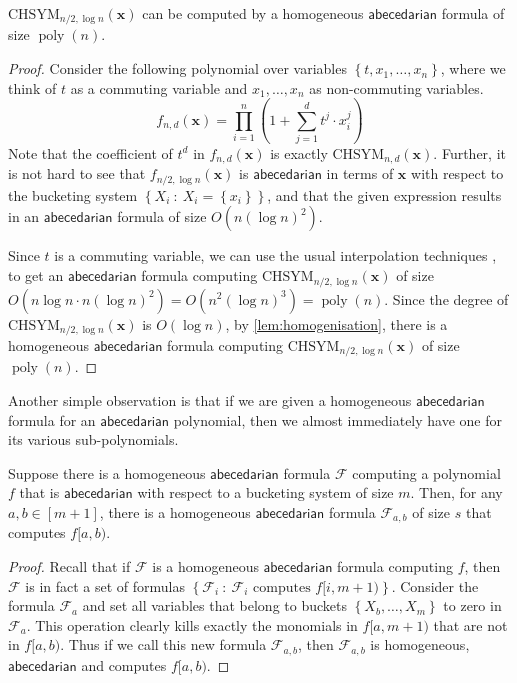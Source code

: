 \documentclass[10pt,a4paper]{article}
\def\poly{\operatorname{poly}}
\def\set#1{\left\{ #1 \right\}}
\def\inparen#1{\left( #1 \right)}
\def\inbrace#1{\left\{ #1 \right\}}
\def\setdef#1#2{\inbrace{ #1 \ : \ #2}}
\def\vecx{\mathbf{x}}
\newcommand{\form}{\textbf{$\mathcal{F}$}}
\newcommand{\abcd}{\mathsf{abecedarian}}
\newcommand{\chsym}[2]{\mathrm{CHSYM}_{#1,#2}}
\begin{document}
\begin{observation}\label{obs:UBonCHSYMlogDeg}
	$\chsym{n/2}{\log n}(\vecx)$ can be computed by a homogeneous $\abcd$ formula of size $\poly(n)$.
\end{observation}

\begin{proof}
	Consider the following polynomial over variables $\set{t, x_1, \ldots, x_n}$, where we think of $t$ as a commuting variable and $x_1, \ldots, x_n$ as non-commuting variables. 
	\[
		f_{n, d}(\vecx) = \prod_{i=1}^{n} \inparen{1 + \sum_{j=1}^{d} t^j \cdot x_i^j}
	\]
	Note that the coefficient of $t^d$ in $f_{n, d}(\vecx)$ is exactly $\chsym{n}{d}(\vecx)$.
	Further, it is not hard to see that $f_{n/2, \log n}(\vecx)$ is $\abcd$ in terms of $\vecx$ with respect to the bucketing system $\setdef{X_i}{X_i = \set{x_i}}$, and that the given expression results in an $\abcd$ formula of size $O(n (\log n)^2)$. 
	
	Since $t$ is a commuting variable, we can use the usual interpolation techniques \cite{BC92}, to get an $\abcd$ formula computing $\chsym{n/2}{\log n}(\vecx)$ of size $O(n \log n \cdot n (\log n)^2) = O(n^2 (\log n)^3) = \poly(n)$. 
	Since the degree of $\chsym{n/2}{\log n}(\vecx)$ is $O(\log n)$, by \autoref{lem:homogenisation}, there is a homogeneous $\abcd$ formula computing $\chsym{n/2}{\log n}(\vecx)$ of size $\poly(n)$.
\end{proof}

\noindent Another simple observation is that if we are given a homogeneous $\abcd$ formula for an $\abcd$ polynomial, then we almost immediately have one for its various sub-polynomials.

\begin{observation}\label{obs:subformula}
	Suppose there is a homogeneous $\abcd$ formula $\form$ computing a polynomial $f$ that is $\abcd$ with respect to a bucketing system of size $m$. 
	Then, for any $a, b \in [m+1]$, there is a homogeneous $\abcd$ formula $\form_{a,b}$ of size $s$ that computes $f[a,b)$.
\end{observation}

\begin{proof}
	Recall that if $\form$ is a homogeneous $\abcd$ formula computing $f$, then $\form$ is in fact a set of formulas $\setdef{\form_i}{\form_i \text{ computes } f[i,m+1)}$. 
	Consider the formula $\form_a$ and set all variables that belong to buckets $\set{X_b, \ldots, X_m}$ to zero in $\form_a$. 
	This operation clearly kills exactly the monomials in $f[a,m+1)$ that are not in $f[a,b)$.
	Thus if we call this new formula $\form_{a,b}$, then $\form_{a,b}$ is homogeneous, $\abcd$ and computes $f[a,b)$.
\end{proof}
\end{document}
